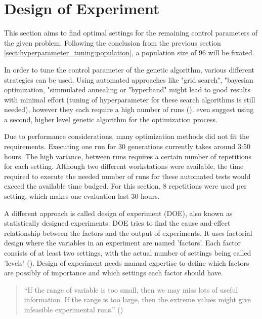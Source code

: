 \section{Design of Experiment}
\label{sect:hyperparameter_tuning:design_of_experiment}
This section aims to find optimal settings for the remaining control parameters of the given problem.
Following the conclusion from the previous section \ref{sect:hyperparameter_tuning:population}, a population size of 96 will be fixated. 

In order to tune the control parameter of the genetic algorithm, various different strategies can be used. Using automated approaches like "grid search", "bayesian optimization, "simmulated annealing or "hyperband" might lead to good results with minimal effort (tuning of hyperparameter for these search algorithms is still needed), however they each require a high number of runs (\cite{kacprzyk_parameter_2007}). \cite{kacprzyk_parameter_2007} even suggest using a second, higher level genetic algorithm for the optimization process.

Due to performance considerations, many optimization methods did not fit the requirements.
Executing one run for 30 generations currently takes around 3:50 hours. The high variance, between runs requires a certain number of repetitions for each setting. Although two different workstations were available, the time required to execute the needed number of runs for these automated tests would exceed the available time budged. For this section, 8 repetitions were used per setting, which makes one evaluation last 30 hours.

A different approach is called design of experiment (DOE), also known as statistically designed experiments. DOE tries to find the cause and-effect relationship between the factors and the output of experiments.
It uses factorial design where the variables in an experiment are named 'factors'. Each factor consists of at least two settings, with the actual number of settings being called 'levels' (\cite{yang_design_2009}). Design of experiment needs manual expertise to define which factors are possibly of importance and which settings each factor should have.

\begin{quote}
	\begin{em}
		\enquote{If the range of variable is too small, then we may miss lots of useful information. If the range is too large, then the extreme values might give infeasible experimental runs.} (\cite{yang_design_2009})
	\end{em}
\end{quote}

